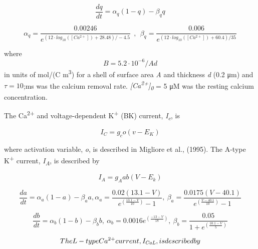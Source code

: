 \documentclass[a4paper]{article}
\begin{document}
\begin{equation}
\frac{dq}{dt}=α_q(1-q)-β_qq
\end{equation}

\begin{equation}
α_q=\frac{0.00246}{e^{(12\cdot log_{10}([Ca^{2+}])+28.48)/-4.5}} \ \ ,\ \ 
β_q=\frac{0.006}{e^{(12\cdot log_{10}([Ca^{2+}])+60.4)/35}}
\end{equation}



where
\begin{equation}
B = 5.2\cdot 10^{-6}/Ad
\end{equation}
in units of mol/(C m\textsuperscript{3}) for a shell of
surface area \textit{A} and thickness \textit{d} (0.2 μm) and  $τ=10$;ms was the calcium removal rate. \textit{[Ca}\textit{\textsuperscript{2+}}\textit{]}\textit{\textsubscript{0}} = 5 μM was the resting calcium concentration. 


The Ca\textsuperscript{2+} and voltage-dependent K\textsuperscript{+} (BK) current,
\textit{I}\textit{\textsubscript{c}}, is 


\begin{equation}
I_C=g_co(v-E_K)
\end{equation}


where activation variable, \textit{o}, is described in Migliore et al., (1995). The A-type K\textsuperscript{+} current,
\textit{I}\textit{\textsubscript{A}}, is described by\ \ 


\begin{equation}
I_A=g_A ab (V-E_k)
\end{equation}

\begin{equation}
\frac{da}{dt}=α_a(1-a)-β_aa , 
α_a=\frac{0.02(13.1-V)}{e^{(\frac{13.1-V}{10})}-1}, \ 
β_a=\frac{0.0175(V-40.1)}{e^{(\frac{V-40.1}{10})}-1}
\end{equation}

\begin{equation}
\frac{db}{dt}=α_b(1-b)-β_bb , \ 
α_b=0.0016e^{(\frac{-13-V}{18})}, \  β_b=\frac{0.05}{1+e^{(\frac{10.1-V} 5)}}
\end{equation}

\begin{equation}
The L-type Ca\textsuperscript{2+} current, \textit{I}\textit{\textsubscript{CaL}}, is described by
\end{equation}
\end{document}
